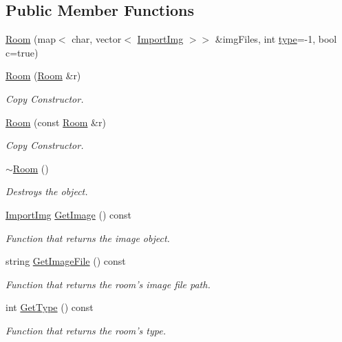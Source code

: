 \subsection*{Public Member Functions}
\begin{DoxyCompactItemize}
\item 
\hyperlink{classRoom_a663dea7097ec22880177b341d183f17a}{Room} (map$<$ char, vector$<$ \hyperlink{classImportImg}{Import\-Img} $>$$>$ \&img\-Files, int \hyperlink{classRoom_a209eba22dbc85cb190906de3f0363e59}{type}=-\/1, bool c=true)
\item 
\hyperlink{classRoom_aca32b3fea56db79f0ef01521f567d680}{Room} (\hyperlink{classRoom}{Room} \&r)
\begin{DoxyCompactList}\small\item\em Copy Constructor. \end{DoxyCompactList}\item 
\hyperlink{classRoom_aad7d195b7a4eeefd332db96adcdb6b22}{Room} (const \hyperlink{classRoom}{Room} \&r)
\begin{DoxyCompactList}\small\item\em Copy Constructor. \end{DoxyCompactList}\item 
\hyperlink{classRoom_a67d5da09983cc53097807fd43ba5481a}{$\sim$\-Room} ()
\begin{DoxyCompactList}\small\item\em Destroys the object. \end{DoxyCompactList}\item 
\hyperlink{classImportImg}{Import\-Img} \hyperlink{classRoom_a6e60729ff6d267ad84e8e07da70362e7}{Get\-Image} () const 
\begin{DoxyCompactList}\small\item\em Function that returns the image object. \end{DoxyCompactList}\item 
string \hyperlink{classRoom_a8685389724a048cbc9c43d4fd6cd53a4}{Get\-Image\-File} () const 
\begin{DoxyCompactList}\small\item\em Function that returns the room's image file path. \end{DoxyCompactList}\item 
int \hyperlink{classRoom_a829c93b010d46928ac753085e406601a}{Get\-Type} () const 
\begin{DoxyCompactList}\small\item\em Function that returns the room's type. \end{DoxyCompactList}\item 
$$
\end{DoxyCompactItemize}
